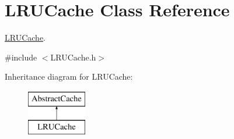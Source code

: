 \hypertarget{classLRUCache}{\section{\-L\-R\-U\-Cache \-Class \-Reference}
\label{classLRUCache}
}


\hyperlink{classLRUCache}{\-L\-R\-U\-Cache}.  




{\ttfamily \#include $<$\-L\-R\-U\-Cache.\-h$>$}

\-Inheritance diagram for \-L\-R\-U\-Cache\-:\begin{figure}[H]
\begin{center}
\leavevmode
\includegraphics[height=2.000000cm]{classLRUCache}
\end{center}
\end{figure}
